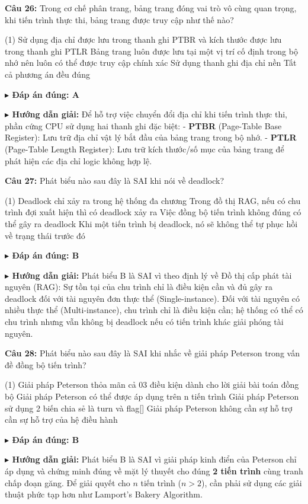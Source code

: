 \documentclass[11pt,a4paper]{article}
\newcommand{\giaithich}[2]{%
    \par\vspace{0.15cm}\noindent
    \begingroup\small
    \noindent\textbf{\color{blue}$\blacktriangleright$ Đáp án đúng: #1} \par\vspace{0.08cm}
    \noindent\textbf{\color{teal}$\blacktriangleright$ Hướng dẫn giải:} #2
    \endgroup\par\vspace{0.35cm}
}
\begin{document}
\noindent\textbf{Câu 26:} Trong cơ chế phân trang, bảng trang đóng vai trò vô cùng quan trọng, khi tiến trình thực thi, bảng trang được truy cập như thế nào?
\begin{tasks}(1)
    \task Sử dụng địa chỉ được lưu trong thanh ghi PTBR và kích thước được lưu trong thanh ghi PTLR
    \task Bảng trang luôn được lưu tại một vị trí cố định trong bộ nhớ nên luôn có thể được truy cập chính xác
    \task Sử dụng thanh ghi địa chỉ nền
    \task Tất cả phương án đều đúng
\end{tasks}
\giaithich{A}{Để hỗ trợ việc chuyển đổi địa chỉ khi tiến trình thực thi, phần cứng CPU sử dụng hai thanh ghi đặc biệt:
- \textbf{PTBR} (Page-Table Base Register): Lưu trữ địa chỉ vật lý bắt đầu của bảng trang trong bộ nhớ.
- \textbf{PTLR} (Page-Table Length Register): Lưu trữ kích thước/số mục của bảng trang để phát hiện các địa chỉ logic không hợp lệ.}

\noindent\textbf{Câu 27:} Phát biểu nào sau đây là SAI khi nói về deadlock?
\begin{tasks}(1)
    \task Deadlock chỉ xảy ra trong hệ thống đa chương
    \task Trong đồ thị RAG, nếu có chu trình đợi xuất hiện thì có deadlock xảy ra
    \task Việc đồng bộ tiến trình không đúng có thể gây ra deadlock
    \task Khi một tiến trình bị deadlock, nó sẽ không thể tự phục hồi về trạng thái trước đó
\end{tasks}
\giaithich{B}{Phát biểu B là SAI vì theo định lý về Đồ thị cấp phát tài nguyên (RAG): Sự tồn tại của chu trình chỉ là điều kiện cần và đủ gây ra deadlock đối với tài nguyên đơn thực thể (Single-instance). Đối với tài nguyên có nhiều thực thể (Multi-instance), chu trình chỉ là điều kiện cần; hệ thống có thể có chu trình nhưng vẫn không bị deadlock nếu có tiến trình khác giải phóng tài nguyên.}

\noindent\textbf{Câu 28:} Phát biểu nào sau đây là SAI khi nhắc về giải pháp Peterson trong vấn đề đồng bộ tiến trình?
\begin{tasks}(1)
    \task Giải pháp Peterson thỏa mãn cả 03 điều kiện dành cho lời giải bài toán đồng bộ
    \task Giải pháp Peterson có thể được áp dụng trên n tiến trình
    \task Giải pháp Peterson sử dụng 2 biến chia sẻ là turn và flag[]
    \task Giải pháp Peterson không cần sự hỗ trợ cần sự hỗ trợ của hệ điều hành
\end{tasks}
\giaithich{B}{Phát biểu B là SAI vì giải pháp kinh điển của Peterson chỉ áp dụng và chứng minh đúng về mặt lý thuyết cho đúng \textbf{2 tiến trình} cùng tranh chấp đoạn găng. Để giải quyết cho $n$ tiến trình ($n > 2$), cần phải sử dụng các giải thuật phức tạp hơn như Lamport's Bakery Algorithm.}
\end{document}
